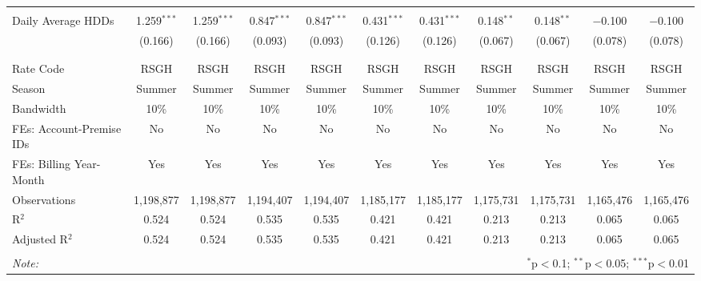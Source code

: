 \begin{table}[!htbp]
\begin{tabular}{@{\extracolsep{5pt}}lcccccccccc}
  & & & & & & & & & & \\ 
 Daily Average HDDs & 1.259$^{***}$ & 1.259$^{***}$ & 0.847$^{***}$ & 0.847$^{***}$ & 0.431$^{***}$ & 0.431$^{***}$ & 0.148$^{**}$ & 0.148$^{**}$ & $-$0.100 & $-$0.100 \\ 
  & (0.166) & (0.166) & (0.093) & (0.093) & (0.126) & (0.126) & (0.067) & (0.067) & (0.078) & (0.078) \\ 
  & & & & & & & & & & \\ 
\hline \\[-1.8ex] 
Rate Code & RSGH & RSGH & RSGH & RSGH & RSGH & RSGH & RSGH & RSGH & RSGH & RSGH \\ 
Season & Summer & Summer & Summer & Summer & Summer & Summer & Summer & Summer & Summer & Summer \\ 
Bandwidth & 10\% & 10\% & 10\% & 10\% & 10\% & 10\% & 10\% & 10\% & 10\% & 10\% \\ 
FEs: Account-Premise IDs & No & No & No & No & No & No & No & No & No & No \\ 
FEs: Billing Year-Month & Yes & Yes & Yes & Yes & Yes & Yes & Yes & Yes & Yes & Yes \\ 
Observations & 1,198,877 & 1,198,877 & 1,194,407 & 1,194,407 & 1,185,177 & 1,185,177 & 1,175,731 & 1,175,731 & 1,165,476 & 1,165,476 \\ 
R$^{2}$ & 0.524 & 0.524 & 0.535 & 0.535 & 0.421 & 0.421 & 0.213 & 0.213 & 0.065 & 0.065 \\ 
Adjusted R$^{2}$ & 0.524 & 0.524 & 0.535 & 0.535 & 0.421 & 0.421 & 0.213 & 0.213 & 0.065 & 0.065 \\ 
\hline 
\hline \\[-1.8ex] 
\textit{Note:}  & \multicolumn{10}{r}{$^{*}$p$<$0.1; $^{**}$p$<$0.05; $^{***}$p$<$0.01} \\ 
\end{tabular} 
\end{table} 
